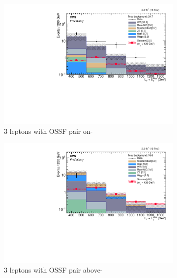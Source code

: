 \begin{figure}
\begin{center}
	\begin{subfigure}[b]{.5\textwidth}
		\includegraphics[width=\textwidth]{Results/plots/L3DYz1}
		\caption{3 leptons with OSSF pair on-\Z}
	\end{subfigure}%
	\begin{subfigure}[b]{.5\textwidth}
		\includegraphics[width=\textwidth]{Results/plots/L3DYh1}
		\caption{3 leptons with OSSF pair above-\Z}
	\end{subfigure}
	\begin{subfigure}[b]{.5\textwidth}

\end{subfigure}
\end{center}
\end{figure}
